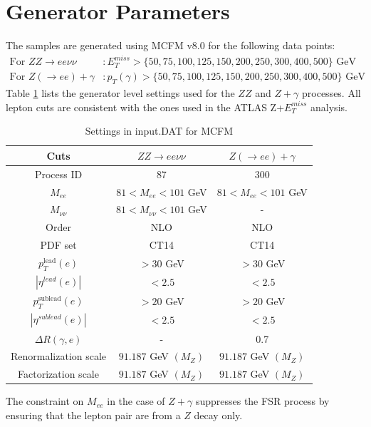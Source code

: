 \documentclass[11pt,a4paper]{report}
\begin{document}
\section{Generator Parameters}
The samples are generated using MCFM v8.0 for the following data points:
\begin{align*}
	\text{For } ZZ \rightarrow ee\nu\nu &: E_T^{miss} > \{50,75,100,125,150,200,250,300,400,500\}\text{ GeV} \\
	\text{For } Z(\rightarrow ee)+\gamma &: p_T(\gamma) > \{50,75,100,125,150,200,250,300,400,500\}\text{ GeV}
\end{align*}
Table \ref{table:default} lists the generator level settings used for the $ZZ$ and $Z+\gamma$ processes. All lepton cuts are consistent with the ones used in the ATLAS Z+$E_T^{miss}$ analysis.
\begin{table}[H]
\begin{center}
	\begin{tabular}{|c|c|c|}
	\hline
	\textbf{Cuts} &$ZZ \rightarrow ee\nu\nu$ & $Z(\rightarrow ee)+\gamma$\\
	\hline
	Process ID & 87 & 300\\
	$M_{ee}$ & $81 < M_{ee} < 101$ GeV & $81 < M_{ee} < 101$ GeV\\
	$M_{\nu\nu}$ & $81 < M_{\nu\nu} < 101$ GeV& -\\
	Order & NLO & NLO\\
	PDF set & CT14 & CT14\\
	$p_T^{\text{lead}}(e)$ & $> 30$ GeV & $> 30$ GeV\\
	$|\eta^{lead}(e)|$ & $< 2.5$ & $< 2.5$\\
	$p_T^{\text{sublead}}(e)$ & $> 20$ GeV & $> 20$ GeV\\
	$|\eta^{sublead}(e)|$ & $< 2.5$ & $< 2.5$\\
	$\Delta R(\gamma,e)$ & - & 0.7\\
	Renormalization scale & $91.187$ GeV $(M_{Z})$& $91.187$ GeV $(M_{Z})$\\
	Factorization scale & $91.187$ GeV $(M_{Z})$& $91.187$ GeV $(M_{Z})$\\
	\hline
	\end{tabular}
	\caption{Settings in input.DAT for MCFM}
	\label{table:default}
	\end{center}
\end{table}
The constraint on $M_{ee}$ in the case of $Z+\gamma$ suppresses the FSR process by ensuring that the lepton pair are from a $Z$ decay only.
\end{document}
